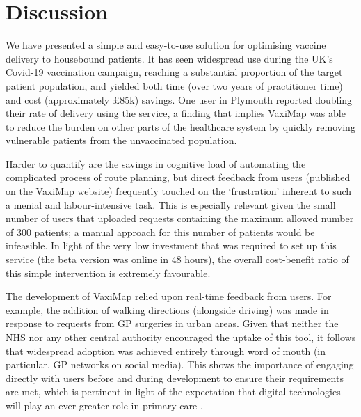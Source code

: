 \documentclass[review]{elsarticle}
\def\vm{VaxiMap}
\begin{document}
\section{Discussion}

We have presented a simple and easy-to-use solution for optimising vaccine delivery to housebound patients. It has seen widespread use during the UK's Covid-19 vaccination campaign, reaching a substantial proportion of the target patient population, and yielded both time (over two years of practitioner time) and cost (approximately £85k) savings. One user in Plymouth reported doubling their rate of delivery using the service, a finding that implies \vm{} was able to reduce the burden on other parts of the healthcare system by quickly removing vulnerable patients from the unvaccinated population. 

Harder to quantify are the savings in cognitive load of automating the complicated process of route planning, but direct feedback from users (published on the \vm{} website) frequently touched on the `frustration' inherent to such a menial and labour-intensive task. This is especially relevant given the small number of users that uploaded requests containing the maximum allowed number of 300 patients; a manual approach for this number of patients would be infeasible. In light of the very low investment that was required to set up this service (the beta version was online in 48 hours), the overall cost-benefit ratio of this simple intervention is extremely favourable. 

The development of \vm{} relied upon real-time feedback from users. For example, the addition of walking directions (alongside driving) was made in response to requests from GP surgeries in urban areas. Given that neither the NHS nor any other central authority encouraged the uptake of this tool, it follows that widespread adoption was achieved entirely through word of mouth (in particular, GP networks on social media). This shows the importance of engaging directly with users before and during development to ensure their requirements are met, which is pertinent in light of the expectation that digital technologies will play an ever-greater role in primary care \cite{WorldHealthOrganizationWHO2018}. 
\end{document}
